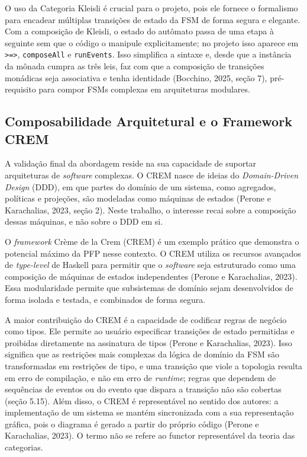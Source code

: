 \documentclass[12pt,a4paper]{article}
\begin{document}
O uso da Categoria Kleisli é crucial para o projeto, pois ele fornece o formalismo para encadear múltiplas transições de estado da FSM de forma segura e elegante. Com a composição de Kleisli, o estado do autômato passa de uma etapa à seguinte sem que o código o manipule explicitamente; no projeto isso aparece em \texttt{>=>}, \texttt{composeAll} e \texttt{runEvents}. Isso simplifica a sintaxe e, desde que a instância da mônada cumpra as três leis, faz com que a composição de transições monádicas seja associativa e tenha identidade (Bocchino, 2025, seção 7), pré-requisito para compor FSMs complexas em arquiteturas modulares.

\subsection{Composabilidade Arquitetural e o Framework CREM}

A validação final da abordagem reside na sua capacidade de suportar arquiteturas de \textit{software} complexas. O CREM nasce de ideias do \textit{Domain-Driven Design} (DDD), em que partes do domínio de um sistema, como agregados, políticas e projeções, são modeladas como máquinas de estados (Perone e Karachalias, 2023, seção 2). Neste trabalho, o interesse recai sobre a composição dessas máquinas, e não sobre o DDD em si.

O \textit{framework} Crème de la Crem (CREM) é um exemplo prático que demonstra o potencial máximo da PFP nesse contexto. O CREM utiliza os recursos avançados de \textit{type-level} de Haskell para permitir que o \textit{software} seja estruturado como uma composição de máquinas de estados independentes (Perone e Karachalias, 2023). Essa modularidade permite que subsistemas de domínio sejam desenvolvidos de forma isolada e testada, e combinados de forma segura.

A maior contribuição do CREM é a capacidade de codificar regras de negócio como tipos. Ele permite ao usuário especificar transições de estado permitidas e proibidas diretamente na assinatura de tipos (Perone e Karachalias, 2023). Isso significa que as restrições mais complexas da lógica de domínio da FSM são transformadas em restrições de tipo, e uma transição que viole a topologia resulta em erro de compilação, e não em erro de \textit{runtime}; regras que dependem de sequências de eventos ou do evento que dispara a transição não são cobertas (seção 5.15). Além disso, o CREM é representável no sentido dos autores: a implementação de um sistema se mantém sincronizada com a sua representação gráfica, pois o diagrama é gerado a partir do próprio código (Perone e Karachalias, 2023). O termo não se refere ao functor representável da teoria das categorias.
\end{document}
